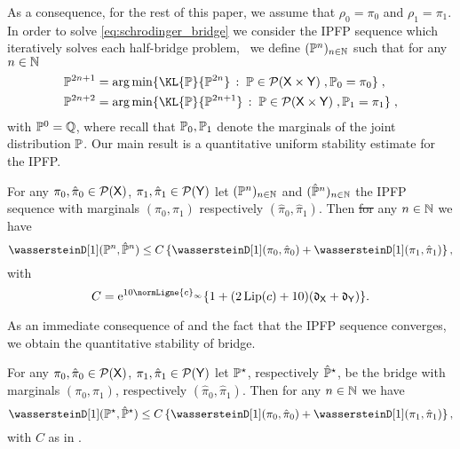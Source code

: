 \documentclass[11pt,a4paper]{article}
\providecommand{\DIFdeltex}[1]{{\protect\color{red}\sout{#1}}}                      %
\providecommand{\DIFaddbegin}{} %
\providecommand{\DIFaddend}{} %
\providecommand{\DIFdelbegin}{} %
\providecommand{\DIFdelend}{} %
\providecommand{\DIFdel}[1]{\texorpdfstring{\DIFdeltex{#1}}{}} %
\begin{document}
As a consequence, for the rest of this paper, we assume that $\rho_0 = \pi_0$
and $\rho_1 = \pi_1$.  In order to solve \eqref{eq:schrodinger_bridge} we
consider the IPFP sequence which iteratively solves each half-bridge problem,
\ie \ we define $(\mathbb{P}^n)_{n \in \mathbb{N}}$ such that for any $n \in \mathbb{N}$
\begin{align}
  \label{eq:ipfp}
  &\Pbb^{2n+1} = \argmin \DIFdelbegin %
\DIFdelend \DIFaddbegin \ensembleLigne{\KL{\Pbb}{\Pbb^{2n}}}{\Pbb \in \Pens(\msx \times \msy) \eqsp , \Pbb_0 = \pi_0}  \DIFaddend \eqsp , \\
  &\Pbb^{2n+2} = \argmin \ensembleLigne{\KL{\Pbb}{\Pbb^{2n+1}}}{\Pbb \in \Pens(\msx \times \msy) \eqsp , \Pbb_1 = \pi_1} \DIFaddbegin \eqsp \DIFaddend ,
\end{align}
with $\mathbb{P}^0 = \mathbb{Q}$, where recall that $\mathbb{P}_0, \mathbb{P}_1$ denote the marginals of the joint distribution $\mathbb{P}$. Our main result is a quantitative 
uniform stability estimate for the IPFP.

\begin{theorem}
  \label{thm:stability_ipfp}
  For any $\pi_0, \hat{\pi}_0 \in \mathcal{P}(\mathsf{X})$,
  $\pi_1, \hat{\pi}_1 \in \mathcal{P}(\mathsf{Y})$ let $(\mathbb{P}^{n})_{n\in \mathbb{N}}$ and
  $(\hat{\mathbb{P}}^{n})_{n\in \mathbb{N}}$ the IPFP sequence with marginals
  $(\pi_0, \pi_1)$ respectively $(\hat{\pi}_0, \hat{\pi}_1)$. Then \DIFdelbegin \DIFdel{for }\DIFdelend any $n \in \mathbb{N}$ we have
  \begin{equation}
    \wassersteinD[1](\Pbb^n, \hat{\Pbb}^n) \leq C \defEns{\wassersteinD[1](\pi_0, \hat{\pi}_0) + \wassersteinD[1](\pi_1, \hat{\pi}_1)},
  \end{equation}
  with
  \begin{equation}
    C = \rme^{10 \normLigne{c}_\infty} \{1 + (2\Lip(c)+10) (\diam_\msx + \diam_\msy) \}.
  \end{equation}
\end{theorem}

As an immediate consequence of  and the fact that
the IPFP sequence converges, we obtain the quantitative stability of \schro bridge.

\begin{corollary}
  \label{thm:stability_schro}
  For any $\pi_0, \hat{\pi}_0 \in \mathcal{P}(\mathsf{X})$,
  $\pi_1, \hat{\pi}_1 \in \mathcal{P}(\mathsf{Y})$ let $\mathbb{P}^\star$, respectively $\hat{\mathbb{P}}^\star$, be
  the \schro bridge with marginals $(\pi_0, \pi_1)$, respectively
  $(\hat{\pi}_0, \hat{\pi}_1)$. Then  for any
  $n \in \mathbb{N}$ we have
  \begin{equation}
    \wassersteinD[1](\Pbb^\star, \hat{\Pbb}^\star) \leq C \defEns{\wassersteinD[1](\pi_0, \hat{\pi}_0) + \wassersteinD[1](\pi_1, \hat{\pi}_1)},
  \end{equation}
  with $C$ as in .
\end{corollary}
\end{document}

